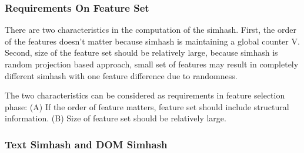 \subsubsection{Requirements On Feature Set}
There are two characteristics in the computation of the simhash. First, the order of
the features doesn't matter because simhash is maintaining a global counter V.
Second, size of the feature set should be relatively large, because simhash is
random projection based approach, small set of features may result in completely
different simhash with one feature difference due to randomness.

The two characteristics can be considered as requirements in feature selection
phase: (A) If the order of feature matters, feature set should include
structural information. (B) Size of feature set should be relatively large.

%

\subsubsection{Text Simhash and DOM Simhash}
%
%
%
%
%
%
%

